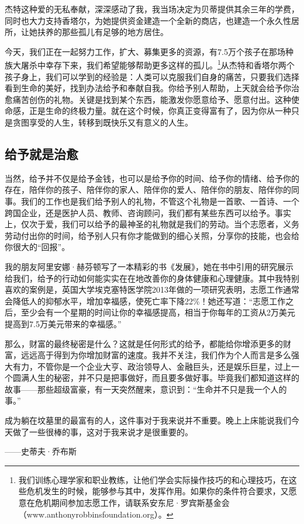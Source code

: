 杰特这种爱的无私奉献，深深感动了我，我当场决定为贝蒂提供其余三年的学费，同时也大力支持香塔尔，为她提供资金建造一个全新的商店，也建造一个永久性居所，让她扶养的那些孤儿有足够的地方居住。

今天，我们正在一起努力工作，扩大、募集更多的资源，有7.5万个孩子在那场种族大屠杀中幸存下来，我们希望能够帮助更多这样的孤儿。\footnote{\label{fn:pdf-46-1}我们训练心理学家和职业教练，让他们学会实际操作技巧的和心理技巧，在这些危机发生的时候，能够参与其中，发挥作用。如果你的条件符合要求，又愿意在危机期间参加志愿工作，请联系安东尼·罗宾斯基金会（www.anthonyrobbinsfoundation.org）。}从杰特和香塔尔两个孩子身上，我们可以学到的经验是：人类可以克服我们自身的痛苦，只要我们选择看到生命的美好，找到办法给予和奉献自我。你给予别人帮助，上天就会给予你治愈痛苦创伤的礼物。关键是找到某个东西，能激发你愿意给予、愿意付出。这种使命感，正是生命的终极力量。就在这个时候，你真正变得富有了，因为你从一种只是贪图享受的人生，转移到既快乐又有意义的人生。

\subsection{给予就是治愈}

当然，给予并不仅是给予金钱，也可以是给予你的时间、给予你的情绪、给予你的存在，陪伴你的孩子、陪伴你的家人、陪伴你的爱人、陪伴你的朋友、陪伴你的同事。我们的工作也是我们给予别人的礼物，不管这个礼物是一首歌、一首诗、一个跨国企业，还是医护人员、教师、咨询顾问，我们都有某些东西可以给予。事实上，仅次于爱，我们可以给予的最神圣的礼物就是我们的劳动。当个志愿者，义务劳动付出你的时间，给予别人只有你才能做到的细心关照，分享你的技能，也会给你很大的“回报”。

我的朋友阿里安娜·赫芬顿写了一本精彩的书《发展》，她在书中引用的研究展示给我们，给予的行动如何能实实在在地改善你的身体健康和心理健康。其中我特别喜欢的案例是，英国大学埃克塞特医学院2013年做的一项研究表明，志愿工作通常会降低人的抑郁水平，增加幸福感，使死亡率下降22\%！她还写道：“志愿工作之后，至少会有一个星期的时间让你的幸福感提高，相当于你每年的工资从2万美元提高到7.5万美元带来的幸福感。”

那么，财富的最终秘密是什么？这就是任何形式的给予，都能给你增添更多的财富，远远高于得到为你增加财富的速度。我并不关注，我们作为个人而言是多么强大有力，不管你是一个企业大亨、政治领导人、金融巨头，还是娱乐巨星，过上一个圆满人生的秘密，并不只是把事做好，而且要多做好事。毕竟我们都知道这样的故事——那些超级富豪，有一天突然醒来，意识到：“生命并不只是我一个人的事。”

\begin{BookQuote}
成为躺在坟墓里的最富有的人，这件事对于我来说并不重要。晚上上床能说我们今天做了一些很棒的事，这对于我来说才是很重要的。

\hfill ——史蒂夫·乔布斯
\end{BookQuote}

